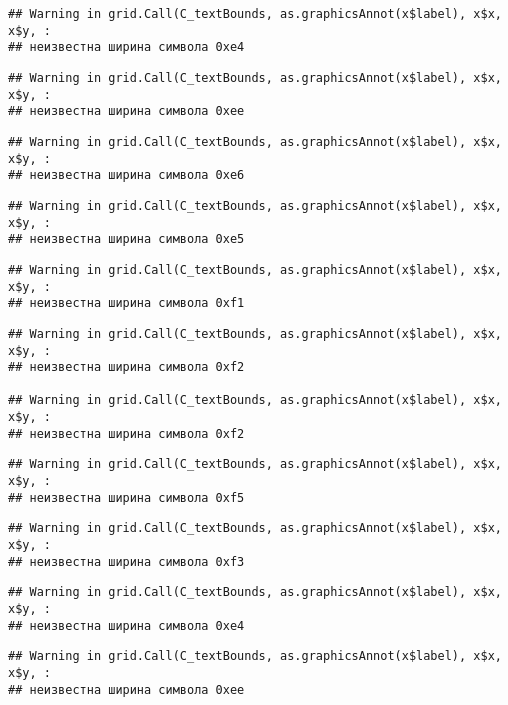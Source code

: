 \documentclass[
]{article}
\begin{document}
\begin{verbatim}
## Warning in grid.Call(C_textBounds, as.graphicsAnnot(x$label), x$x, x$y, :
## неизвестна ширина символа 0xe4
\end{verbatim}

\begin{verbatim}
## Warning in grid.Call(C_textBounds, as.graphicsAnnot(x$label), x$x, x$y, :
## неизвестна ширина символа 0xee
\end{verbatim}

\begin{verbatim}
## Warning in grid.Call(C_textBounds, as.graphicsAnnot(x$label), x$x, x$y, :
## неизвестна ширина символа 0xe6
\end{verbatim}

\begin{verbatim}
## Warning in grid.Call(C_textBounds, as.graphicsAnnot(x$label), x$x, x$y, :
## неизвестна ширина символа 0xe5
\end{verbatim}

\begin{verbatim}
## Warning in grid.Call(C_textBounds, as.graphicsAnnot(x$label), x$x, x$y, :
## неизвестна ширина символа 0xf1
\end{verbatim}

\begin{verbatim}
## Warning in grid.Call(C_textBounds, as.graphicsAnnot(x$label), x$x, x$y, :
## неизвестна ширина символа 0xf2

## Warning in grid.Call(C_textBounds, as.graphicsAnnot(x$label), x$x, x$y, :
## неизвестна ширина символа 0xf2
\end{verbatim}

\begin{verbatim}
## Warning in grid.Call(C_textBounds, as.graphicsAnnot(x$label), x$x, x$y, :
## неизвестна ширина символа 0xf5
\end{verbatim}

\begin{verbatim}
## Warning in grid.Call(C_textBounds, as.graphicsAnnot(x$label), x$x, x$y, :
## неизвестна ширина символа 0xf3
\end{verbatim}

\begin{verbatim}
## Warning in grid.Call(C_textBounds, as.graphicsAnnot(x$label), x$x, x$y, :
## неизвестна ширина символа 0xe4
\end{verbatim}

\begin{verbatim}
## Warning in grid.Call(C_textBounds, as.graphicsAnnot(x$label), x$x, x$y, :
## неизвестна ширина символа 0xee
\end{verbatim}
\end{document}
